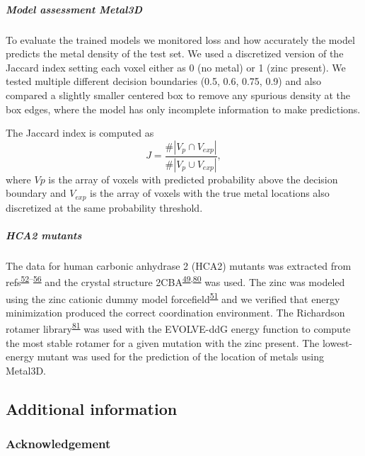 \documentclass[  ASAPversion,
  ,
  9pt]{elife}
\begin{document}
\hypertarget{model-assessment-metal3d}{%
\subparagraph{Model assessment Metal3D}\label{model-assessment-metal3d}}

To evaluate the trained models we monitored loss and how accurately the model predicts the metal density of the test set. We used a discretized version of the Jaccard index setting each voxel either as 0 (no metal) or 1 (zinc present). We tested multiple different decision boundaries (0.5, 0.6, 0.75, 0.9) and also compared a slightly smaller centered box to remove any spurious density at the box edges, where the model has only incomplete information to make predictions.

The Jaccard index is computed as
\[
J=\frac{\#\left|V_{p} \cap V_{exp}\right|}{\#\left|V_{p} \cup V_{exp}\right|},
\]
where \(Vp\) is the array of voxels with predicted probability above the decision boundary and \(V_{exp}\) is the array of voxels with the true metal locations also discretized at the same probability threshold.

\hypertarget{hca2-mutants}{%
\subparagraph{HCA2 mutants}\label{hca2-mutants}}

The data for human carbonic anhydrase 2 (HCA2) mutants was extracted from refs\textsuperscript{\protect\hyperlink{ref-D3VQQdjb}{52}--\protect\hyperlink{ref-TNbPH3Y1}{56}} and the crystal structure 2CBA\textsuperscript{\protect\hyperlink{ref-jyFnBdWm}{49},\protect\hyperlink{ref-WjHESl20}{80}} was used. The zinc was modeled using the zinc cationic dummy model forcefield\textsuperscript{\protect\hyperlink{ref-pchdLF0k}{51}} and we verified that energy minimization produced the correct coordination environment. The Richardson rotamer library\textsuperscript{\protect\hyperlink{ref-Mg40Hdad}{81}} was used with the EVOLVE-ddG energy function to compute the most stable rotamer for a given mutation with the zinc present. The lowest-energy mutant was used for the prediction of the location of metals using Metal3D.

\hypertarget{additional-information}{%
\subsection{Additional information}\label{additional-information}}

\hypertarget{acknowledgement}{%
\subsubsection{Acknowledgement}\label{acknowledgement}}
\end{document}
